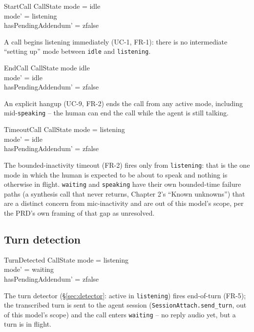 \documentclass[a4paper,10pt,fleqn]{article}
\begin{document}
\begin{schema}{StartCall}
  \Delta CallState
  \where
  mode = idle \\
  mode' = listening \\
  hasPendingAddendum' = zfalse
\end{schema}

A call begins listening immediately (UC-1, FR-1): there is no
intermediate ``setting up'' mode between \texttt{idle} and
\texttt{listening}.

\begin{schema}{EndCall}
  \Delta CallState
  \where
  mode \neq idle \\
  mode' = idle \\
  hasPendingAddendum' = zfalse
\end{schema}

An explicit hangup (UC-9, FR-2) ends the call from any active mode,
including mid-\texttt{speaking} -- the human can end the call while the
agent is still talking.

\begin{schema}{TimeoutCall}
  \Delta CallState
  \where
  mode = listening \\
  mode' = idle \\
  hasPendingAddendum' = zfalse
\end{schema}

The bounded-inactivity timeout (FR-2) fires only from \texttt{listening}:
that is the one mode in which the human is expected to be about to speak
and nothing is otherwise in flight. \texttt{waiting} and \texttt{speaking}
have their own bounded-time failure paths (a synthesis call that never
returns, Chapter 2's ``Known unknowns'') that are a distinct concern from
mic-inactivity and are out of this model's scope, per the PRD's own framing
of that gap as unresolved.

\subsection{Turn detection}

\begin{schema}{TurnDetected}
  \Delta CallState
  \where
  mode = listening \\
  mode' = waiting \\
  hasPendingAddendum' = zfalse
\end{schema}

The turn detector (\S\ref{sec:detector}: active in \texttt{listening}) fires
end-of-turn (FR-5); the transcribed turn is sent to the agent session
(\texttt{SessionAttach.send\_turn}, out of this model's scope) and the call
enters \texttt{waiting} -- no reply audio yet, but a turn is in flight.
\end{document}
